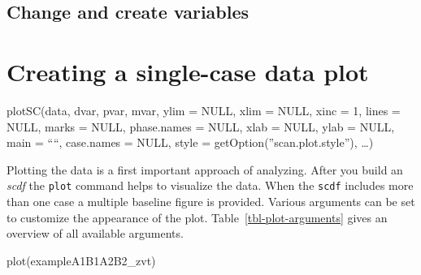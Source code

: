 \documentclass[
  letterpaper,
  DIV=11,
  numbers=noendperiod]{scrreprt}
\newenvironment{Shaded}{\begin{snugshade}}{\end{snugshade}}
\newcommand{\FunctionTok}[1]{\textcolor[rgb]{0.28,0.35,0.67}{#1}}
\newcommand{\NormalTok}[1]{\textcolor[rgb]{0.00,0.23,0.31}{#1}}
\begin{document}
\hypertarget{change-and-create-variables}{%
\section{Change and create
variables}\label{change-and-create-variables}}

\hypertarget{creating-a-single-case-data-plot}{%
\chapter{Creating a single-case data
plot}\label{creating-a-single-case-data-plot}}

\begin{tcolorbox}[enhanced jigsaw, toprule=.15mm, colframe=quarto-callout-tip-color-frame, left=2mm, colback=white, breakable, bottomrule=.15mm, arc=.35mm, rightrule=.15mm, leftrule=.75mm, opacityback=0]
\begin{minipage}[t]{5.5mm}
\textcolor{quarto-callout-tip-color}{\faLightbulb}
\end{minipage}%
\begin{minipage}[t]{\textwidth - 5.5mm}
plotSC(data, dvar, pvar, mvar, ylim = NULL, xlim = NULL, xinc = 1, lines
= NULL, marks = NULL, phase.names = NULL, xlab = NULL, ylab = NULL, main
= ````, case.names = NULL, style = getOption(''scan.plot.style''),
\ldots)\end{minipage}%
\end{tcolorbox}

Plotting the data is a first important approach of analyzing. After you
build an \emph{scdf} the \texttt{plot} command helps to visualize the
data. When the \texttt{scdf} includes more than one case a multiple
baseline figure is provided. Various arguments can be set to customize
the appearance of the plot. Table~\ref{tbl-plot-arguments} gives an
overview of all available arguments.

\begin{Shaded}
\begin{Highlighting}[]
\FunctionTok{plot}\NormalTok{(exampleA1B1A2B2\_zvt)}
\end{Highlighting}
\end{Shaded}
\end{document}
